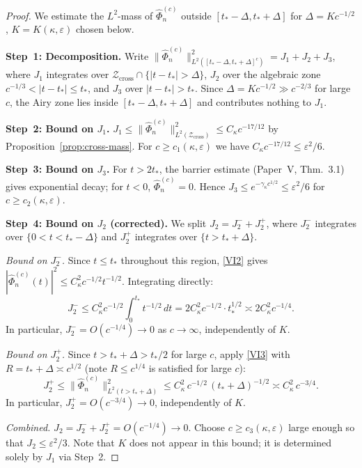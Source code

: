 \documentclass[12pt,a4paper]{amsart}
\theoremstyle{definition}
\theoremstyle{remark}
\newcommand{\Zcross}{\mathcal{Z}_{\mathrm{cross}}}
\begin{document}
\begin{proof}
We estimate the $L^2$-mass of $\widehat{\Phi}_n^{(c)}$
outside $[t_* - \Delta, t_* + \Delta]$
for $\Delta = K c^{-1/2}$, $K = K(\kappa,\varepsilon)$
chosen below.

\textbf{Step~1: Decomposition.}
Write
$\|\widehat{\Phi}_n^{(c)}\|_{L^2([t_*-\Delta, t_*+\Delta]^c)}^2
= J_1 + J_2 + J_3$,
where $J_1$ integrates over $\Zcross \cap \{|t-t_*|>\Delta\}$,
$J_2$ over the algebraic zone
$c^{-1/3} < |t-t_*| \le t_*$,
and $J_3$ over $|t-t_*| > t_*$.
Since $\Delta = Kc^{-1/2} \gg c^{-2/3}$ for large $c$,
the Airy zone lies inside $[t_*-\Delta, t_*+\Delta]$
and contributes nothing to $J_1$.

\textbf{Step~2: Bound on $J_1$.}
$J_1 \le \|\widehat{\Phi}_n^{(c)}\|^2_{L^2(\Zcross)}
\le C_\kappa c^{-17/12}$
by Proposition~\ref{prop:cross-mass}.
For $c \ge c_1(\kappa,\varepsilon)$ we have
$C_\kappa c^{-17/12} \le \varepsilon^2/6$.

\textbf{Step~3: Bound on $J_3$.}
For $t > 2t_*$, the barrier estimate
(Paper~V, Thm.~3.1) gives exponential decay;
for $t < 0$, $\widehat{\Phi}_n^{(c)} = 0$.
Hence $J_3 \le e^{-\gamma_\kappa c^{1/2}} \le \varepsilon^2/6$
for $c \ge c_2(\kappa,\varepsilon)$.

\textbf{Step~4: Bound on $J_2$ (corrected).}
We split $J_2 = J_2^- + J_2^+$, where
$J_2^-$ integrates over $\{0 < t < t_* - \Delta\}$
and $J_2^+$ integrates over $\{t > t_* + \Delta\}$.

\textit{Bound on $J_2^-$.}
Since $t \le t_*$ throughout this region,
\eqref{VI2} gives
$|\widehat{\Phi}_n^{(c)}(t)|^2 \le C_\kappa^2 c^{-1/2} t^{-1/2}$.
Integrating directly:
\[
J_2^-
\le C_\kappa^2 c^{-1/2}
\int_0^{t_*} t^{-1/2}\,dt
= 2C_\kappa^2 c^{-1/2} \cdot t_*^{1/2}
\asymp 2C_\kappa^2 c^{-1/4}.
\]
In particular, $J_2^- = O(c^{-1/4}) \to 0$
as $c \to \infty$, independently of $K$.

\textit{Bound on $J_2^+$.}
Since $t > t_* + \Delta > t_*/2$ for large $c$,
apply \eqref{VI3} with $R = t_* + \Delta \asymp c^{1/2}$
(note $R \le c^{1/4}$ is satisfied for large $c$):
\[
J_2^+
\le \|\widehat{\Phi}_n^{(c)}\|^2_{L^2(t > t_*+\Delta)}
\le C_\kappa^2\,c^{-1/2}\,(t_*+\Delta)^{-1/2}
\asymp C_\kappa^2\,c^{-3/4}.
\]
In particular, $J_2^+ = O(c^{-3/4}) \to 0$,
independently of $K$.

\textit{Combined.}
$J_2 = J_2^- + J_2^+ = O(c^{-1/4}) \to 0$.
Choose $c \ge c_3(\kappa,\varepsilon)$ large enough
so that $J_2 \le \varepsilon^2/3$.
Note that $K$ does not appear in this bound;
it is determined solely by $J_1$ via Step~2.


\end{proof}
\end{document}
